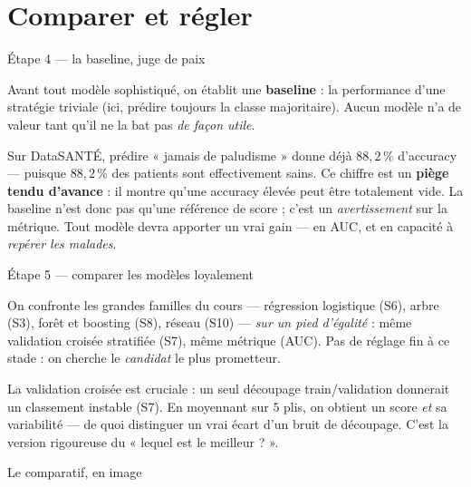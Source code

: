 \documentclass[aspectratio=169,11pt]{beamer}
\begin{document}
\section{Comparer et régler}

\begin{frame}{Étape 4 — la baseline, juge de paix}
\begin{ucaddef}
{\small Avant tout modèle sophistiqué, on établit une \textbf{baseline} : la performance d'une stratégie triviale (ici, prédire toujours la classe majoritaire). Aucun modèle n'a de valeur tant qu'il ne la bat pas \emph{de façon utile}.}
\end{ucaddef}
{\small Sur DataSANTÉ, prédire « jamais de paludisme » donne déjà $88{,}2\,\%$ d'accuracy — puisque $88{,}2\,\%$ des patients sont effectivement sains. Ce chiffre est un \textbf{piège tendu d'avance} : il montre qu'une accuracy élevée peut être totalement vide. La baseline n'est donc pas qu'une référence de score ; c'est un \emph{avertissement} sur la métrique. Tout modèle devra apporter un vrai gain — en AUC, et en capacité à \emph{repérer les malades}.}
\end{frame}

\begin{frame}{Étape 5 — comparer les modèles loyalement}
\begin{ucaddef}
{\small On confronte les grandes familles du cours — régression logistique (S6), arbre (S3), forêt et boosting (S8), réseau (S10) — \emph{sur un pied d'égalité} : même validation croisée stratifiée (S7), même métrique (AUC). Pas de réglage fin à ce stade : on cherche le \emph{candidat} le plus prometteur.}
\end{ucaddef}
{\small La validation croisée est cruciale : un seul découpage train/validation donnerait un classement instable (S7). En moyennant sur $5$ plis, on obtient un score \emph{et} sa variabilité — de quoi distinguer un vrai écart d'un bruit de découpage. C'est la version rigoureuse du « lequel est le meilleur ? ».}
\end{frame}

\begin{frame}{Le comparatif, en image}
\end{frame}
\end{document}
